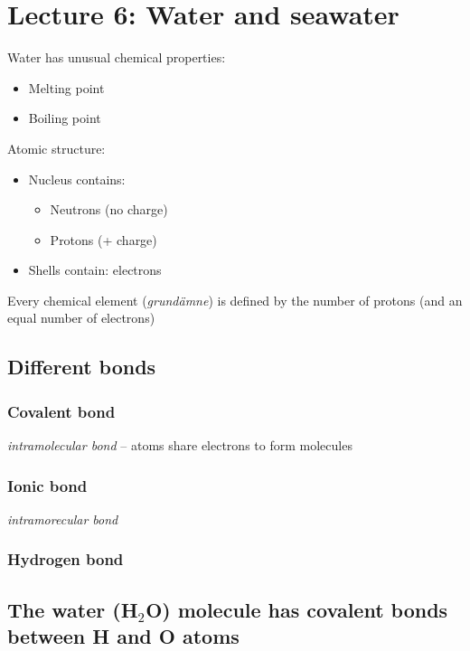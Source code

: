 \section{Lecture 6: Water and seawater}

Water has unusual chemical properties:
\begin{itemize}
    \item Melting point
    \item Boiling point
\end{itemize}

Atomic structure:

\begin{itemize}
    \item Nucleus contains:
    \begin{itemize}
        \item Neutrons (no charge)
        \item Protons (+ charge)
    \end{itemize}
    \item Shells contain: electrons
\end{itemize}

Every chemical element (\textit{grundämne}) is defined by the
number of protons (and an equal number of electrons)

\subsection{Different bonds}

\subsubsection{Covalent bond}

\textit{intramolecular bond} -- atoms share electrons to form molecules

\subsubsection{Ionic bond}
\textit{intramorecular bond}

\subsubsection{Hydrogen bond}

\subsection{The water (H$_2$O) molecule has covalent bonds between
H and O atoms}

